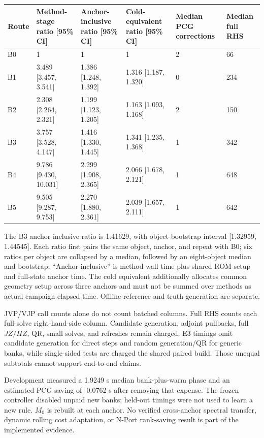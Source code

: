 \documentclass[11pt]{article}
\begin{document}
\begin{table}[tbp]\centering\footnotesize\setlength{\tabcolsep}{3pt}
\begin{tabularx}{\linewidth}{lXXXXX}\toprule
Route & Method-stage ratio [95\% CI] & Anchor-inclusive ratio [95\% CI] & Cold-equivalent ratio [95\% CI] & Median PCG corrections & Median full RHS \\\midrule
B0 & 1 & 1 & 1 & 2 & 66 \\
B1 & 3.489 [3.457, 3.541] & 1.386 [1.248, 1.392] & 1.316 [1.187, 1.320] & 0 & 234 \\
B2 & 2.308 [2.264, 2.321] & 1.199 [1.123, 1.205] & 1.163 [1.093, 1.168] & 2 & 150 \\
B3 & 3.757 [3.528, 4.147] & 1.416 [1.330, 1.445] & 1.341 [1.235, 1.368] & 1 & 342 \\
B4 & 9.786 [9.430, 10.031] & 2.299 [1.908, 2.365] & 2.066 [1.678, 2.121] & 1 & 648 \\
B5 & 9.505 [9.287, 9.753] & 2.270 [1.880, 2.361] & 2.039 [1.657, 2.111] & 1 & 642 \\
\bottomrule\end{tabularx}
\end{table}

The B3 anchor-inclusive ratio is 1.41629, with object-bootstrap interval [1.32959, 1.44545]. Each ratio first pairs the same object, anchor, and repeat with B0; six ratios per object are collapsed by a median, followed by an eight-object median and bootstrap. ``Anchor-inclusive'' is method wall time plus shared ROM setup and full-state anchor time. The cold equivalent additionally allocates common geometry setup across three anchors and must not be summed over methods as actual campaign elapsed time. Offline reference and truth generation are separate.

JVP/VJP call counts alone do not count batched columns. Full RHS counts each full-solve right-hand-side column. Candidate generation, adjoint pullbacks, full \(JZ/HZ\), QR, small solves, and refreshes remain charged. E3 timings omit candidate generation for direct steps and random generation/QR for generic banks, while single-sided tests are charged the shared paired build. Those unequal subtotals cannot support end-to-end claims.

Development measured a 1.9249 s median bank-plus-warm phase and an estimated PCG saving of -0.0762 s after removing that expense. The frozen controller disabled unpaid new banks; held-out timings were not used to learn a new rule. \(M_0\) is rebuilt at each anchor. No verified cross-anchor spectral transfer, dynamic rolling cost adaptation, or N-Port rank-saving result is part of the implemented evidence.
\end{document}

